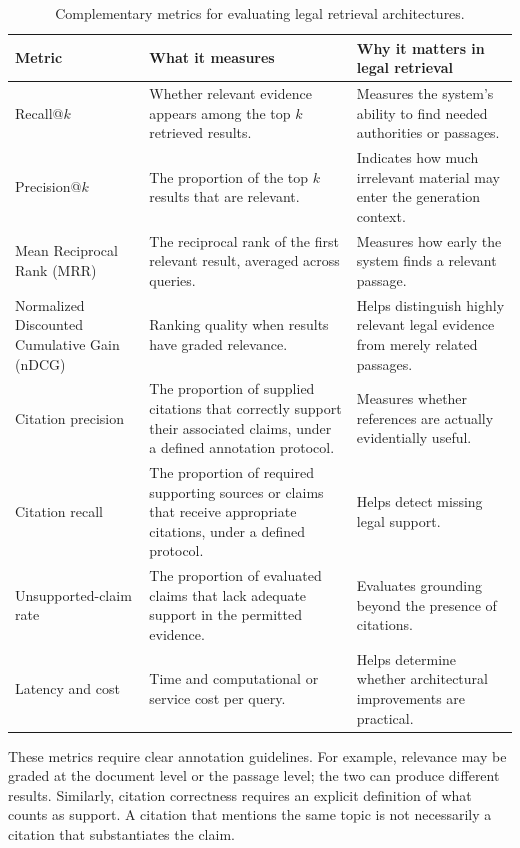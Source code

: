 \begin{table}[tp]
\centering
\caption{Complementary metrics for evaluating legal retrieval architectures.}
\label{tab:metrics}
\footnotesize
\setlength{\tabcolsep}{5pt}
\renewcommand{\arraystretch}{1.3}
\begin{tabularx}{\textwidth}{>{\raggedright\arraybackslash}p{4.2cm} >{\raggedright\arraybackslash}X >{\raggedright\arraybackslash}X}
\toprule
\textbf{Metric} & \textbf{What it measures} & \textbf{Why it matters in legal retrieval} \\
\midrule
Recall@$k$ & Whether relevant evidence appears among the top $k$ retrieved results. & Measures the system's ability to find needed authorities or passages. \\
Precision@$k$ & The proportion of the top $k$ results that are relevant. & Indicates how much irrelevant material may enter the generation context. \\
Mean Reciprocal Rank (MRR) & The reciprocal rank of the first relevant result, averaged across queries. & Measures how early the system finds a relevant passage. \\
Normalized Discounted Cumulative Gain (nDCG) & Ranking quality when results have graded relevance. & Helps distinguish highly relevant legal evidence from merely related passages. \\
Citation precision & The proportion of supplied citations that correctly support their associated claims, under a defined annotation protocol. & Measures whether references are actually evidentially useful. \\
Citation recall & The proportion of required supporting sources or claims that receive appropriate citations, under a defined protocol. & Helps detect missing legal support. \\
Unsupported-claim rate & The proportion of evaluated claims that lack adequate support in the permitted evidence. & Evaluates grounding beyond the presence of citations. \\
Latency and cost & Time and computational or service cost per query. & Helps determine whether architectural improvements are practical. \\
\bottomrule
\end{tabularx}
\end{table}

These metrics require clear annotation guidelines. For example, relevance may be graded at the document
level or the passage level; the two can produce different results. Similarly, citation correctness
requires an explicit definition of what counts as support. A citation that mentions the same topic is
not necessarily a citation that substantiates the claim.

